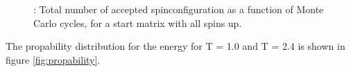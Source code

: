 \documentclass{article}
\begin{document}
{{\begin{figure}
\caption{: Total number of accepted spinconfiguration as a function of Monte Carlo cycles, for a start matrix with all spins up. }
\label{fig:flips_random}
\end{figure}


The propability distribution for the energy for T = 1.0 and T = 2.4 is shown in figure \ref{fig:propability}.

}}
\end{document}

